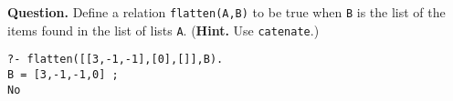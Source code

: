     \noindent\textbf{Question.} Define a relation \texttt{flatten(A,B)} to
    be true when \texttt{B} is the list of the items found in the list
    of lists \texttt{A}. (\textbf{Hint.} Use \texttt{catenate}.)
{\small
\begin{verbatim}
?- flatten([[3,-1,-1],[0],[]],B).
B = [3,-1,-1,0] ;
No
\end{verbatim}
}
